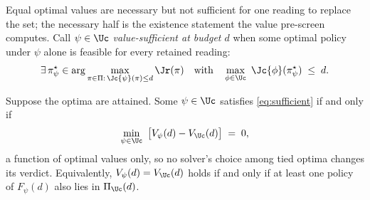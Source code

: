 Equal optimal values are necessary but not sufficient for one reading to replace the set;
the necessary half is the existence statement the value pre-screen computes. Call
$\psi\in\Uc$ \emph{value-sufficient at budget $d$} when some optimal policy under $\psi$
alone is feasible for every retained reading:
\begin{equation}
\exists\,\pi^\star_\psi\in\arg\max_{\pi\in\Pi:\,\Jc{\psi}(\pi)\le d}\Jr(\pi)
\quad\text{with}\quad
\max_{\phi\in\Uc}\ \Jc{\phi}(\pi^\star_\psi)\;\le\;d .
\label{eq:sufficient}
\end{equation}

\begin{lemma}
\label{prop:tiesafe}
Suppose the optima are attained. Some $\psi\in\Uc$ satisfies
\eqref{eq:sufficient} if and only if
\begin{equation}
\min_{\psi\in\Uc}\ \big[V_\psi(d)-V_{\Uc}(d)\big]\;=\;0 ,
\label{eq:screen}
\end{equation}
a function of optimal values only, so no solver's choice among tied optima
changes its verdict. Equivalently, $V_\psi(d)=V_{\Uc}(d)$ holds if and
only if at least one policy of $F_\psi(d)$ also lies in $\Pi_{\Uc}(d)$.
\end{lemma}


